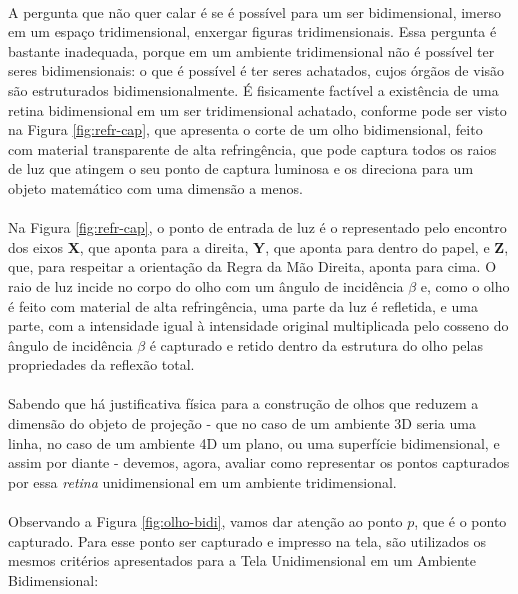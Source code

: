 \documentclass{article}
\begin{document}
	\paragraph{}
	A pergunta que não quer calar é se é possível para um ser bidimensional, imerso em um espaço tridimensional, enxergar figuras tridimensionais. Essa pergunta é bastante inadequada, porque em um ambiente tridimensional não é possível ter seres bidimensionais: o que é possível é ter seres achatados, cujos órgãos de visão são estruturados bidimensionalmente. É fisicamente factível a existência de uma retina bidimensional em um ser tridimensional achatado, conforme pode ser visto na Figura \ref{fig:refr-cap}, que apresenta o corte de um olho bidimensional, feito com material transparente de alta refringência, que pode captura todos os raios de luz que atingem o seu ponto de captura luminosa e os direciona para um objeto matemático com uma dimensão a menos.
	
	\paragraph{}
	Na Figura \ref{fig:refr-cap}, o ponto de entrada de luz é o representado pelo encontro dos eixos \textbf{X}, que aponta para a direita, \textbf{Y}, que aponta para dentro do papel, e \textbf{Z}, que, para respeitar a orientação da Regra da Mão Direita, aponta para cima. O raio de luz incide no corpo do olho com um ângulo de incidência $\beta$ e, como o olho é feito com material de alta refringência, uma parte da luz é refletida, e uma parte, com a intensidade igual à intensidade original multiplicada pelo cosseno do ângulo de incidência $\beta$ é capturado e retido dentro da estrutura do olho pelas propriedades da reflexão total.
	
	\paragraph{}
	Sabendo que há justificativa física para a construção de olhos que reduzem a dimensão do objeto de projeção - que no caso de um ambiente 3D seria uma linha, no caso de um ambiente 4D um plano, ou uma superfície bidimensional, e assim por diante - devemos, agora, avaliar como representar os pontos capturados por essa \textit{retina} unidimensional em um ambiente tridimensional.
	
	\paragraph{}
	Observando a Figura \ref{fig:olho-bidi}, vamos dar atenção ao ponto $p$, que é o ponto capturado. Para esse ponto ser capturado e impresso na tela, são utilizados os mesmos critérios apresentados para a Tela Unidimensional em um Ambiente Bidimensional:
	
\end{document}
